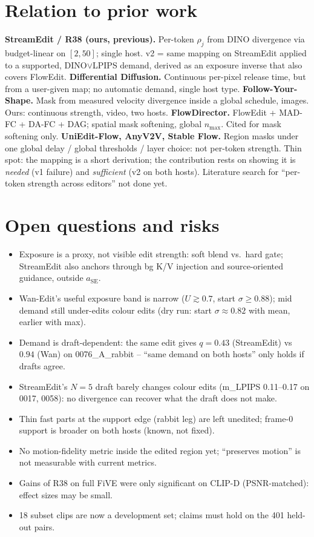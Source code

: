 \documentclass{article}
\begin{document}
\section{Relation to prior work}
\textbf{StreamEdit / R38 (ours, previous).} Per-token $\rho_j$ from DINO divergence via budget-linear on $[2,50]$; single host. v2 = same mapping on StreamEdit applied to a supported, DINO$\lor$LPIPS demand, derived as an exposure inverse that also covers FlowEdit.
\textbf{Differential Diffusion.} Continuous per-pixel release time, but from a user-given map; no automatic demand, single host type.
\textbf{Follow-Your-Shape.} Mask from measured velocity divergence inside a global schedule, images. Ours: continuous strength, video, two hosts.
\textbf{FlowDirector.} FlowEdit + MAD-FC + DA-FC + DAG; spatial mask softening, global $n_{\max}$. Cited for mask softening only.
\textbf{UniEdit-Flow, AnyV2V, Stable Flow.} Region masks under one global delay / global thresholds / layer choice: not per-token strength.
Thin spot: the mapping is a short derivation; the contribution rests on showing it is \emph{needed} (v1 failure) and \emph{sufficient} (v2 on both hosts). Literature search for ``per-token strength across editors'' not done yet.

\section{Open questions and risks}
\begin{itemize}
\item Exposure is a proxy, not visible edit strength: soft blend vs.\ hard gate; StreamEdit also anchors through bg K/V injection and source-oriented guidance, outside $a_{\mathrm{SE}}$.
\item Wan-Edit's useful exposure band is narrow ($U\gtrsim0.7$, start $\sigma\ge0.88$); mid demand still under-edits colour edits (dry run: start $\sigma\approx0.82$ with mean, earlier with max).
\item Demand is draft-dependent: the same edit gives $q=0.43$ (StreamEdit) vs $0.94$ (Wan) on 0076\_A\_rabbit -- ``same demand on both hosts'' only holds if drafts agree.
\item StreamEdit's $N=5$ draft barely changes colour edits (m\_LPIPS 0.11--0.17 on 0017, 0058): no divergence can recover what the draft does not make.
\item Thin fast parts at the support edge (rabbit leg) are left unedited; frame-0 support is broader on both hosts (known, not fixed).
\item No motion-fidelity metric inside the edited region yet; ``preserves motion'' is not measurable with current metrics.
\item Gains of R38 on full FiVE were only significant on CLIP-D (PSNR-matched): effect sizes may be small.
\item 18 subset clips are now a development set; claims must hold on the 401 held-out pairs.
\end{itemize}
\end{document}
